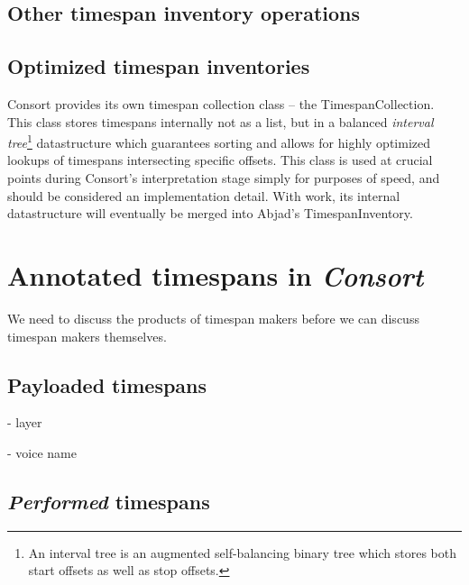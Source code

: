 \subsection{Other timespan inventory operations} %

\begin{comment}
TimespanInventory.clip_timespan_durations
TimespanInventory.count_offsets()
TimespanInventory.explode()
TimespanInventory.round_offsets()
\end{comment}

\subsection{Optimized timespan inventories} %

Consort provides its own timespan collection class -- the TimespanCollection.
This class stores timespans internally not as a list, but in a balanced
\emph{interval tree}\footnote{An interval tree is an augmented self-balancing
binary tree which stores both start offsets as well as stop offsets.}
datastructure which guarantees sorting and allows for highly optimized lookups
of timespans intersecting specific offsets. This class is used at crucial
points during Consort's interpretation stage simply for purposes of speed, and
should be considered an implementation detail. With work, its internal
datastructure will eventually be merged into Abjad's TimespanInventory.

\section{Annotated timespans in \emph{Consort}}

We need to discuss the products of timespan makers before we can discuss
timespan makers themselves.

\subsection{Payloaded timespans} %

- layer

- voice name

\subsection{\emph{Performed} timespans} %

